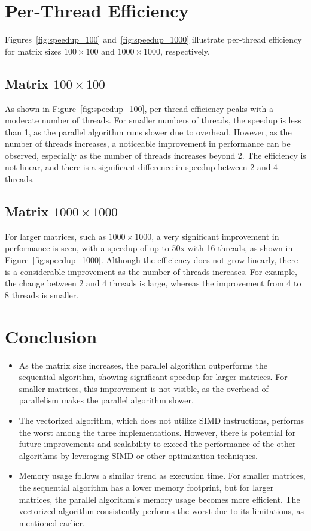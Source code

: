 \documentclass[a4paper,12pt]{article}
\begin{document}
\section{Per-Thread Efficiency}

Figures~\ref{fig:speedup_100} and~\ref{fig:speedup_1000} illustrate per-thread efficiency for matrix sizes $100 \times 100$ and $1000 \times 1000$, respectively.

\subsection{Matrix $100 \times 100$}
As shown in Figure~\ref{fig:speedup_100}, per-thread efficiency peaks with a moderate number of threads. For smaller numbers of threads, the speedup is less than 1, as the parallel algorithm runs slower due to overhead. However, as the number of threads increases, a noticeable improvement in performance can be observed, especially as the number of threads increases beyond 2. The efficiency is not linear, and there is a significant difference in speedup between 2 and 4 threads.

\subsection{Matrix $1000 \times 1000$}
For larger matrices, such as $1000 \times 1000$, a very significant improvement in performance is seen, with a speedup of up to 50x with 16 threads, as shown in Figure~\ref{fig:speedup_1000}. Although the efficiency does not grow linearly, there is a considerable improvement as the number of threads increases. For example, the change between 2 and 4 threads is large, whereas the improvement from 4 to 8 threads is smaller.

\section{Conclusion}

\begin{itemize}
    \item As the matrix size increases, the parallel algorithm outperforms the sequential algorithm, showing significant speedup for larger matrices. For smaller matrices, this improvement is not visible, as the overhead of parallelism makes the parallel algorithm slower.
    \item The vectorized algorithm, which does not utilize SIMD instructions, performs the worst among the three implementations. However, there is potential for future improvements and scalability to exceed the performance of the other algorithms by leveraging SIMD or other optimization techniques.
    \item Memory usage follows a similar trend as execution time. For smaller matrices, the sequential algorithm has a lower memory footprint, but for larger matrices, the parallel algorithm's memory usage becomes more efficient. The vectorized algorithm consistently performs the worst due to its limitations, as mentioned earlier.
\end{itemize}
\end{document}
